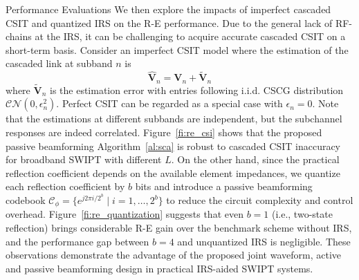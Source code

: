 \documentclass[journal]{IEEEtran}
\begin{document}
\begin{section}{Performance Evaluations}
		We then explore the impacts of imperfect cascaded CSIT and quantized IRS on the R-E performance. Due to the general lack of RF-chains at the IRS, it can be challenging to acquire accurate cascaded CSIT on a short-term basis. Consider an imperfect CSIT model where the estimation of the cascaded link at subband $n$ is
		\begin{equation}
			\hat{\boldsymbol{V}}_{n} = \boldsymbol{V}_{n} + \tilde{\boldsymbol{V}}_{n}
		\end{equation}
		where $\tilde{\boldsymbol{V}}_{n}$ is the estimation error with entries following i.i.d. CSCG distribution $\mathcal{CN}(0, \epsilon_{n}^2)$. Perfect CSIT can be regarded as a special case with $\epsilon_{n}=0$. Note that the estimations at different subbands are independent, but the subchannel responses are indeed correlated. Figure~\ref{fi:re_csi} shows that the proposed passive beamforming Algorithm~\ref{al:sca} is robust to cascaded CSIT inaccuracy for broadband SWIPT with different $L$. On the other hand, since the practical reflection coefficient depends on the available element impedances, we quantize each reflection coefficient by $b$ bits and introduce a passive beamforming codebook $\mathcal{C}_\phi = \{e^{j 2 \pi i / 2^b} \mid i = 1, \dots, 2^b\}$ to reduce the circuit complexity and control overhead. Figure~\ref{fi:re_quantization} suggests that even $b=1$ (i.e., two-state reflection) brings considerable R-E gain over the benchmark scheme without IRS, and the performance gap between $b=4$ and unquantized IRS is negligible. These observations demonstrate the advantage of the proposed joint waveform, active and passive beamforming design in practical IRS-aided SWIPT systems.
	\end{section}
\end{document}
